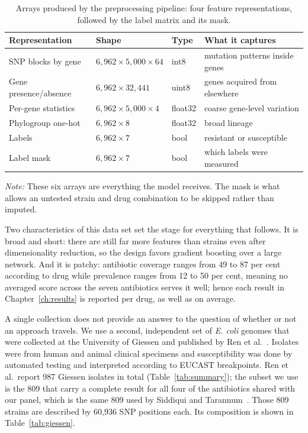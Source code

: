 \begin{table}[htb]
\centering
\caption{Arrays produced by the preprocessing pipeline: four feature
representations, followed by the label matrix and its mask.}
\label{tab:views}
\small
\begin{tabular}{|l|l|l|l|}
\hline
\textbf{Representation} & \textbf{Shape} & \textbf{Type} & \textbf{What it captures} \\
\hline
SNP blocks by gene    & $6{,}962 \times 5{,}000 \times 64$ & int8    & mutation patterns inside genes \\ \hline
Gene presence/absence & $6{,}962 \times 32{,}441$          & uint8   & genes acquired from elsewhere \\ \hline
Per-gene statistics   & $6{,}962 \times 5{,}000 \times 4$  & float32 & coarse gene-level variation \\ \hline
Phylogroup one-hot    & $6{,}962 \times 8$                 & float32 & broad lineage \\ \hline
Labels                & $6{,}962 \times 7$                 & bool    & resistant or susceptible \\ \hline
Label mask            & $6{,}962 \times 7$                 & bool    & which labels were measured \\ \hline
\end{tabular}
\vspace{0.4em}

\noindent\footnotesize\textit{Note:} These six arrays are everything the model receives. The
mask is what allows an untested strain and drug combination to be skipped rather than imputed.
\end{table}

Two characteristics of this data set set the stage for everything that follows. It is broad
and short: there are still far more features than strains even after dimensionality reduction,
so the design favors gradient boosting over a large network. And it is patchy: antibiotic
coverage ranges from 49 to 87 per cent according to drug while prevalence ranges from 12 to 50
per cent, meaning no averaged score across the seven antibiotics serves it well; hence each
result in Chapter~\ref{ch:results} is reported per drug, as well as on average.

\vspace{1em}

A single collection does not provide an answer to the question of whether or not an approach
travels. We use a second, independent set of \textit{E. coli} genomes that were collected at
the University of Giessen and published by Ren et al.~\cite{Ren2022}. Isolates were from human
and animal clinical specimens and susceptibility was done by automated testing and interpreted
according to EUCAST breakpoints. Ren et al.\ report 987 Giessen isolates in total
(Table~\ref{tab:summary}); the subset we use is the 809 that carry a complete
result for all four of the antibiotics shared with our panel, which is the same
809 used by Siddiqui and Tarannum~\cite{siddiqui2025amrensemble}. Those 809
strains are described by 60,936 SNP positions each. Its composition is shown in
Table~\ref{tab:giessen}.


